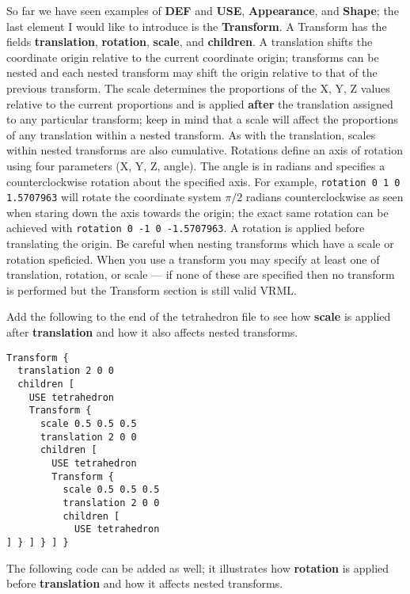 \documentclass[a4paper]{article}
\begin{document}
So far we have seen examples of \textbf{DEF} and \textbf{USE}, \textbf{Appearance}, and \textbf{Shape};
the last element I would like to introduce is the \textbf{Transform}. A Transform has the fields
\textbf{translation}, \textbf{rotation}, \textbf{scale}, and \textbf{children}.  A translation shifts
the coordinate origin relative to the current coordinate origin; transforms can be nested and each
nested transform may shift the origin relative to that of the previous transform.  The scale determines
the proportions of the X, Y, Z values relative to the current proportions and is applied \textbf{after}
the translation assigned to any particular transform; keep in mind that a scale will affect the
proportions of any translation within a nested transform. As with the translation, scales within nested
transforms are also cumulative. Rotations
define an axis of rotation using four parameters (X, Y, Z, angle). The angle is in radians and specifies
a counterclockwise rotation about the specified axis. For example, \verb~rotation 0 1 0 1.5707963~ will
rotate the coordinate system $\pi/2$ radians counterclockwise as seen when staring down the axis towards
the origin; the exact same rotation can be achieved with \verb~rotation 0 -1 0 -1.5707963~. 
A rotation is applied before translating the origin. Be careful when nesting transforms which have
a scale or rotation speficied.  When you use a transform you may specify at least one of translation,
rotation, or scale --- if none of these are specified then no transform is performed but the Transform
section is still valid VRML.

Add the following to the end of the tetrahedron file to see how \textbf{scale} is applied after \textbf{translation}
and how it also affects nested transforms.

\begin{verbatim}
Transform {
  translation 2 0 0
  children [
    USE tetrahedron
    Transform {
      scale 0.5 0.5 0.5
      translation 2 0 0
      children [
        USE tetrahedron
        Transform {
          scale 0.5 0.5 0.5
          translation 2 0 0
          children [
            USE tetrahedron
] } ] } ] }
\end{verbatim}

The following code can be added as well; it illustrates how \textbf{rotation} is applied before \textbf{translation}
and how it affects nested transforms.
\end{document}
